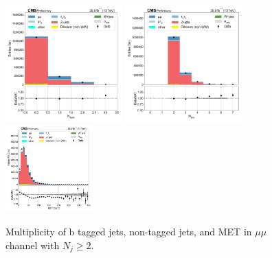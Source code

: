 \begin{figure}[htb!]
    \centering
    \includegraphics[width=0.4\textwidth]{chapters/Appendix/sectionPlots/figures/data_mc_overlays/mumu_2016_inclusive_linear_jet_n_bjets}
    \includegraphics[width=0.4\textwidth]{chapters/Appendix/sectionPlots/figures/data_mc_overlays/mumu_2016_inclusive_linear_jet_n_jets}
    \includegraphics[width=0.3\textwidth]{chapters/Appendix/sectionPlots/figures/data_mc_overlays/mumu_2016_inclusive_linear_misc_met_mag}
    \caption{Multiplicity of b tagged jets, non-tagged jets, and MET in
    $\mu\mu$ channel with $N_{j} \geq 2$.}
    \label{fig:ee_jetmet}
\end{figure}

